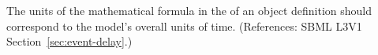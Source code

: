 The units of the mathematical formula in the \Delay of an \Event object
definition should correspond to the model's overall units of time.
(References: SBML L3V1 Section~\ref{sec:event-delay}.)
